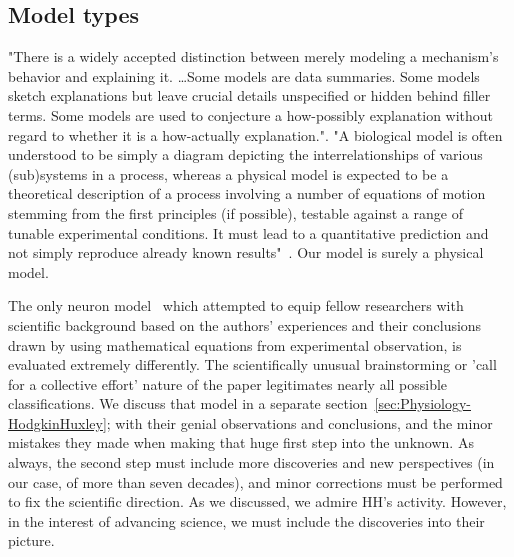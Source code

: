 \subsection{Model types\label{sec:SINGLE_ModelTypes}}

"There is a widely accepted distinction between merely modeling a mechanism's behavior and explaining it. \dots Some models are data summaries. Some
models sketch explanations but leave crucial details unspecified or hidden behind
filler terms. Some models are used to conjecture a how-possibly explanation without regard to whether it is a how-actually explanation."\cite{MechanisticModelHodgkinHuxleyCraver:2006}.
"A biological model is often understood to be simply a diagram depicting the interrelationships of various (sub)systems in a process, whereas a physical model is expected to be a theoretical description of a process involving a number of equations of motion stemming from the first principles (if possible), testable against a range of tunable experimental conditions. It must lead to a quantitative prediction and not simply reproduce already known results"~\cite{MolecularBiophysics:2003}. Our model is surely a physical model.

The only neuron model~\cite{HodgkinHuxley:1952} which attempted to equip 
fellow researchers with scientific
background based on the authors' experiences and their conclusions
drawn by using mathematical equations from experimental observation,
is evaluated extremely differently.
The scientifically unusual brainstorming or 'call for a collective effort' nature
of the paper legitimates nearly all possible classifications. 
We discuss that model in a separate section~\ref{sec:Physiology-HodgkinHuxley};
with their genial observations and conclusions, and the minor mistakes
they made when making that huge first step into the unknown. As always, the second step
must include more discoveries and new perspectives (in our case, of more than seven decades), and minor corrections must be performed to fix the scientific direction.
As we discussed, we admire \gls{HH}'s activity. However, 
in the interest of advancing science, we must include the discoveries
into their picture.

